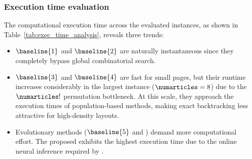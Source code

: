 

\subsubsection{Execution time evaluation}
The computational execution time across the evaluated instances, as shown in Table~\ref{tab:exec_time_analysis}, reveals three trends:

\begin{itemize}
    \item $\baseline{1}$ and $\baseline{2}$ are naturally instantaneous since they completely bypass global combinatorial search.
    \item $\baseline{3}$ and $\baseline{4}$ are fast for small pages, but their runtime increases considerably in the largest instance ($\numarticles=8$) due to the $\numarticles!$ permutation bottleneck. At this scale, they approach the execution times of population-based methods, making exact backtracking less attractive for high-density layouts.
    \item Evolutionary methods ($\baseline{5}$ and \methodNameUniform) demand more computational effort. The proposed \methodNameUniform exhibits the highest execution time due to the online neural inference required by \neuralmethod.
\end{itemize}

